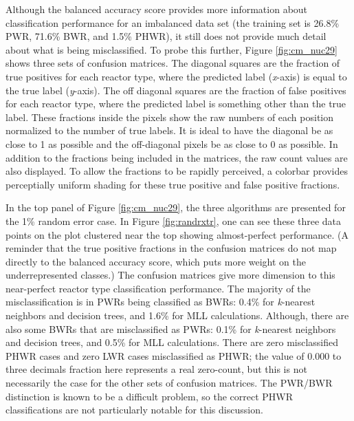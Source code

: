 Although the balanced accuracy score provides more information about
classification performance for an imbalanced data set (the training set is
26.8\% \gls{PWR}, 71.6\% \gls{BWR}, and 1.5\% \gls{PHWR}), it still does not
provide much detail about what is being misclassified. To probe this further,
Figure \ref{fig:cm_nuc29} shows three sets of confusion matrices.  The diagonal
squares are the fraction of true positives for each reactor type, where the
predicted label (\textit{x}-axis) is equal to the true label (\textit{y}-axis).
The off diagonal squares are the fraction of false positives for each reactor
type, where the predicted label is something other than the true label.  These
fractions inside the pixels show the raw numbers of each position normalized to
the number of true labels.  It is ideal to have the diagonal be as close to 1
as possible and the off-diagonal pixels be as close to 0 as possible.  In
addition to the fractions being included in the matrices, the raw count values
are also displayed. To allow the fractions to be rapidly perceived, a colorbar
provides perceptially uniform shading for these true positive and false
positive fractions. 

In the top panel of Figure \ref{fig:cm_nuc29}, the three algorithms are
presented for the 1\% random error case. In Figure \ref{fig:randrxtr}, one can
see these three data points on the plot clustered near the top showing
almost-perfect performance.  (A reminder that the true positive fractions in
the confusion matrices do not map directly to the balanced accuracy score,
which puts more weight on the underrepresented classes.) The confusion matrices
give more dimension to this near-perfect reactor type classification
performance. The majority of the misclassification is in \gls{PWR}s being
classified as \gls{BWR}s: 0.4\% for \textit{k}-nearest neighbors and decision
trees, and 1.6\% for \gls{MLL} calculations. Although, there are also some
\gls{BWR}s that are misclassified as \gls{PWR}s: 0.1\% for \textit{k}-nearest
neighbors and decision trees, and 0.5\% for \gls{MLL} calculations.  There are
zero misclassified \gls{PHWR} cases and zero \gls{LWR} cases misclassified as
\gls{PHWR}; the value of 0.000 to three decimals fraction here represents a
real zero-count, but this is not necessarily the case for the other sets of
confusion matrices.  The \gls{PWR}/\gls{BWR} distinction is known to be a
difficult problem, so the correct \gls{PHWR}
classifications are not particularly notable for this discussion. 

